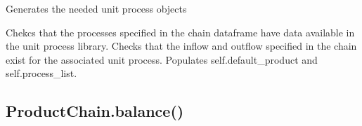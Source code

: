 \documentclass[a4paper,10pt,english]{sphinxmanual}
\begin{document}
\begin{fulllineitems}
\label{\detokenize{chain:processchain.ProductChain.build}}
Generates the needed unit process objects

Chekcs that the processes specified in the chain dataframe have
data available in the unit process library. Checks that the
inflow and outflow specified in the chain exist for the associated
unit process. Populates self.default\_product and self.process\_list.

\end{fulllineitems}



\subsection{ProductChain.balance()}
\label{\detokenize{chain:productchain-balance}}
\end{document}
